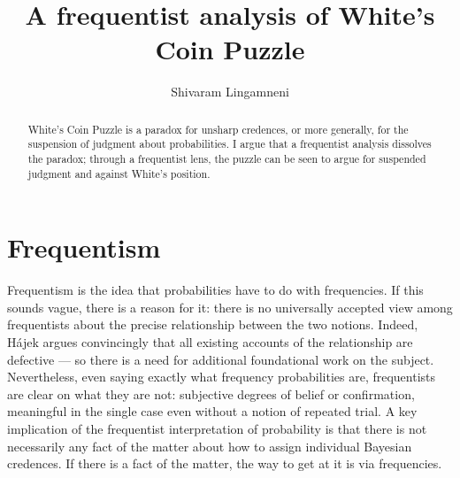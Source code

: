 \documentclass[letterpaper,12pt]{article}
\begin{document}

\title{A frequentist analysis of White's Coin Puzzle}
\author{Shivaram Lingamneni}
\maketitle

\begin{abstract}
White's Coin Puzzle is a paradox for unsharp credences, or more generally, for the suspension of judgment about probabilities. I argue that a frequentist analysis dissolves the paradox; through a frequentist lens, the puzzle can be seen to argue for suspended judgment and against White's position.
\end{abstract}

\section{Frequentism}
Frequentism is the idea that probabilities have to do with frequencies. If this sounds vague, there is a reason for it: there is no universally accepted view among frequentists about the precise relationship between the two notions. Indeed, H\'ajek \citeyearpar{Hajek1996-HJEMR,Hajek2009-HJEFAA} argues convincingly that all existing accounts of the relationship are defective --- so there is a need for additional foundational work on the subject. Nevertheless, even saying exactly what frequency probabilities are, frequentists are clear on what they are not: subjective degrees of belief or confirmation, meaningful in the single case even without a notion of repeated trial. A key implication of the frequentist interpretation of probability is that there is not necessarily any fact of the matter about how to assign individual Bayesian credences. If there is a fact of the matter, the way to get at it is via frequencies.
\end{document}
